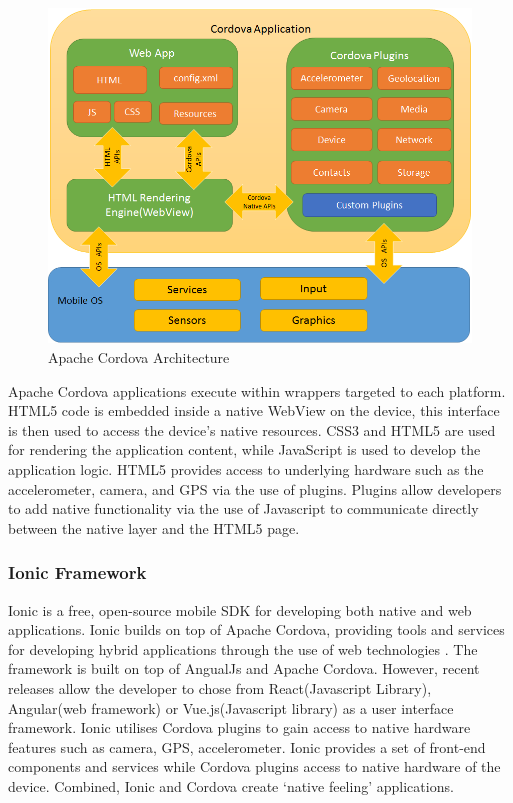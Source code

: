 \begin{figure}[!ht]
\caption{Apache Cordova Architecture \cite{cordova_docs}}
\centering
\includegraphics[width=1\textwidth]{images/apache_cordova.png}
\end{figure}

Apache Cordova applications execute within wrappers targeted to each platform.  HTML5 code is embedded inside a native WebView on the device, this interface is then used to access the device’s native resources. CSS3 and HTML5 are used for rendering the application content, while JavaScript is used to develop the application logic. HTML5 provides access to underlying hardware such as the accelerometer, camera, and GPS via the use of plugins. Plugins allow developers to add native functionality via the use of Javascript to communicate directly between the native layer and the HTML5 page. 


\subsubsection{Ionic Framework}
Ionic is a free, open-source mobile SDK for developing both native and web applications. Ionic builds on top of Apache Cordova, providing tools and services for developing hybrid applications through the use of web technologies \cite{ionidocs}. The framework is built on top of AngualJs and Apache Cordova. However, recent releases allow the developer to chose from React(Javascript Library), Angular(web framework) or Vue.js(Javascript library) as a user interface framework. Ionic utilises Cordova plugins to gain access to native hardware features such as camera, GPS, accelerometer. Ionic provides a set of front-end components and services while Cordova plugins access to native hardware of the device. Combined, Ionic and Cordova create  ‘native feeling’ applications. 

